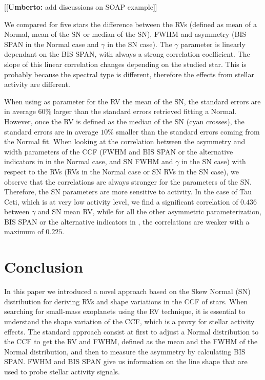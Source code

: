 \documentclass[11pt, oneside]{article}
\def\kms{\hbox{\,km\,s$^{-1}$}}       %
\newcommand{\umberto}[1]{{\color{green}[[\textbf{Umberto: }#1]]}}
\begin{document}
\umberto{add discussions on SOAP example}

We compared for five stars the difference between the RVs (defined as mean of a Normal, mean of the SN or median of the SN), FWHM and asymmetry (BIS SPAN in the Normal case and $\gamma$ in the SN case). The $\gamma$ parameter is linearly dependant on the BIS SPAN, with always a strong correlation coefficient. 
The slope of this linear correlation changes depending on the studied star. This is probably because the spectral type is different, therefore the effects from stellar activity are different.

When using as parameter for the RV the mean of the SN, the standard errors are in average $60\%$ larger than the standard errors retrieved fitting a Normal. However, once the RV is defined as the median of the SN (cyan crosses), the standard errors are in average $10\%$ smaller than the standard errors coming from the Normal fit. When looking at the correlation between the asymmetry and width parameters of the CCF (FWHM and BIS SPAN or the alternative indicators in \citet{Figueira-2013} in the Normal case, and SN FWHM and $\gamma$ in the SN case) with respect to the RVs (RVs in the Normal case or SN RVs in the SN case), we observe that the correlations are always stronger for the parameters of the SN. Therefore, the SN parameters are more sensitive to activity. In the case of Tau Ceti, which is at very low activity level, we find a significant correlation of $0.436$ between $\gamma$ and SN mean RV, while for all the other asymmetric parameterization, BIS SPAN or the alternative indicators in \citet{Figueira-2013}, the correlations are weaker with a maximum of 0.$225$.

\section{Conclusion} \label{sec:conclu}

In this paper we introduced a novel approach based on the Skew Normal (SN) distribution for deriving RVs and shape variations in the CCF of stars. When searching for small-mass exoplanets using the RV technique, it is essential to understand the shape variation of the CCF, which is a proxy for stellar activity effects. The standard approach consist at first to adjust a Normal distribution to the CCF to get the RV and FWHM, defined as the mean and the FWHM of the Normal distribution, and then to measure the asymmetry by calculating BIS SPAN. FWHM and BIS SPAN give us information on the line shape that are used to probe stellar activity signals. 
\end{document}
